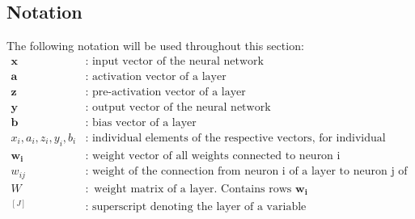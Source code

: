 \subsection{Notation}
\label{subsec:nn-notation}
The following notation will be used throughout this section:
\begin{equation*}
    \begin{array}{ll}
    \bm{x} & : \text { input vector of the neural network} \\
    \bm{a} & : \text { activation vector of a layer} \\
    \bm{z} & : \text { pre-activation vector of a layer} \\
    \bm{y} & : \text { output vector of the neural network} \\
    \bm{b} & : \text { bias vector of a layer} \\
    x_i, a_i, z_i, y_i, b_i & : \text { individual elements of the respective vectors, for individual nodes } \\
    \bm{w_i} & : \text { weight vector of all weights connected to neuron i} \\
    w_{ij} & : \text { weight of the connection from neuron i of a layer to neuron j of the previous layer } \\
    W & : \text { weight matrix of a layer. Contains rows $\bm{w_i}$} \\
    ^{[J]} & : \text { superscript denoting the layer of a variable} \\
    \end{array}
\end{equation*}
